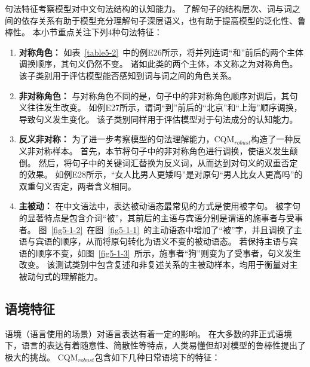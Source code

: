 句法特征考察模型对中文句法结构的认知能力。
了解句子的结构层次、词与词之间的依存关系有助于模型充分理解句子深层语义，也有助于提高模型的泛化性、鲁棒性。
本小节重点关注下列4种句法特征：

\begin{enumerate}
    \item \textbf{对称角色：}
    如表~\ref{table5-2}~中的例E26所示，将并列连词{\kai“和”}前后的两个主体调换顺序，其句义仍然不变。
    诸如此类的两个主体，本文称之为对称角色。
    该子类别用于评估模型能否感知到词与词之间的角色关系。
    \item \textbf{非对称角色：}
    与对称角色不同的是，句子中的非对称角色顺序对调后，其句义往往发生改变。
    如例E27所示，谓词{\kai“到”}前后的{\kai“北京”}和{\kai“上海”}顺序调换，导致句义发生变化。
    该子类别同样用于评估模型对于句法成分的认知能力。
    \item \textbf{反义非对称：}
    为了进一步考察模型的句法理解能力，CQM$_{robust}$构造了一种反义非对称样本。
    首先，本节将句子中的非对称角色进行调换，使语义发生颠倒。
    然后，将句子中的关键词汇替换为反义词，从而达到对句义的双重否定的效果。
    如例E28所示，{\kai“女人比男人更矮吗”}是对原句{\kai“男人比女人更高吗”}的双重句义否定，两者含义相同。
    \item \textbf{主被动：}
    在中文语法中，表达被动语态最常见的方式是使用被字句。
    被字句的显著特点是包含介词{\kai“被”}，其前后的主语与宾语分别是谓语的施事者与受事者。
    图~\ref{fig5-1-2}~在图~\ref{fig5-1-1}~的主动语态中增加了{\kai“被”}字，并且调换了主语与宾语的顺序，从而将原句转化为语义不变的被动语态。
    若保持主语与宾语的顺序不变，如图~\ref{fig5-1-3}~所示，施事者{\kai“狗”}则变为了受事者，句义发生改变。
    该测试类别中包含复述和非复述关系的主被动样本，均用于衡量对主被动句式的理解能力。
\end{enumerate}



\subsection{语境特征}

语境（语言使用的场景）对语言表达有着一定的影响。
在大多数的非正式语境下，语言的表达有着随意性、简散性等特点，人类易懂但却对模型的鲁棒性提出了极大的挑战。
CQM$_{robust}$包含如下几种日常语境下的特征：

